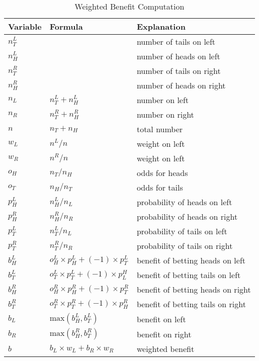\begin{table}
\centering
\begin{tabular}{|l|l|l|} \\ \hline \hline
{\bf Variable} & {\bf Formula} & {\bf Explanation} \\ \hline \hline
\(n_T^L\)  & & number of tails on left \\ \hline
\(n_H^L\)  & & number of heads on left \\ \hline
\(n_T^R\)  & & number of tails on right \\ \hline
\(n_H^R\) & & number of heads on right \\ \hline

\(n_L\)    & \(n_T^L + n_H^L \) & number on left \\ \hline
\(n_R\)    & \(n_T^R + n_H^R \) & number on right \\ \hline

\(n\)      & \(n_T + n_H \) & total number \\ \hline

\(w_L \) & \( n^L/n\)  & weight on left \\ \hline
\(w_R \) & \( n^R/n\)  & weight on left \\ \hline
\hline
\(o_H \) & \( n_T/n_H\) & odds for heads \\ \hline
\(o_T \) & \( n_H/n_T\) & odds for tails \\ \hline
\hline

\(p_H^L \) & \( n_H^L/n_L\) & probability of heads on left \\ \hline
\(p_H^R \) & \( n_H^R/n_R\) & probability of heads on right \\ \hline
\(p_T^L \) & \( n_T^L/n_L\) & probability of tails on left \\ \hline
\(p_T^R \) & \( n_T^R/n_R\) & probability of tails on right \\ \hline
\hline

\(b_H^L\) &  \(o_H^L \times p_H^L + (-1)  \times p_T^L\) &
            benefit of betting heads on left \\ \hline
\(b_T^L\) & \(o_T^L \times p_T^L + (-1)  \times p^H_L \) &
            benefit of betting tails on left \\ \hline

\(b_H^R\) & \(o_H^R \times p_H^R + (-1)  \times p_T^R \) &
            benefit of betting heads on right \\ \hline
\(b_T^R\) & \(o_T^R \times p_T^R + (-1)  \times p_H^R \) &
            benefit of betting tails on right \\ \hline
\hline

\(b_L\) & \( \mathrm{max}(b_H^L, b_T^L)\) & benefit on left \\ \hline
\(b_R\) & \( \mathrm{max}(b_H^R, b_T^R)\) & benefit on right \\ \hline
\hline

\(b\) &  \(b_L \times w_L + b_R \times w_R\) & weighted benefit \\ \hline
\end{tabular}
\label{algo_weighted_benefit}
\caption{Weighted Benefit Computation}
\end{table}
